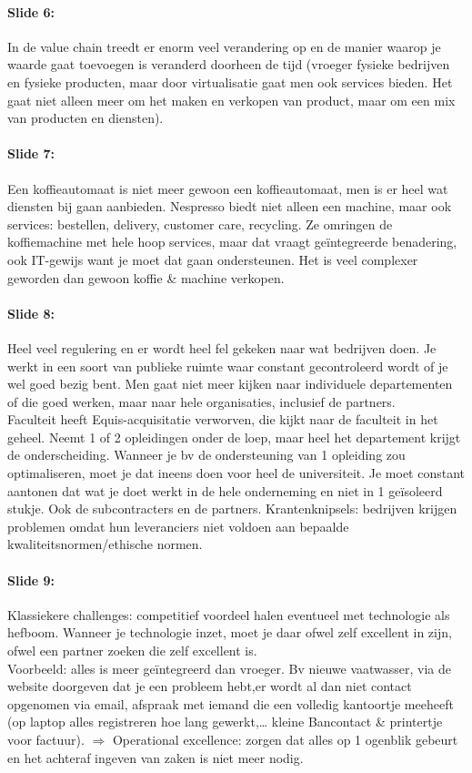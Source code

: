 \documentclass[10pt,a4paper]{report}
\begin{document}
\paragraph{Slide 6:}In de value chain treedt er enorm veel verandering op en de manier waarop je waarde gaat toevoegen is veranderd doorheen de tijd (vroeger fysieke bedrijven en fysieke producten, maar door virtualisatie gaat men ook services bieden. Het gaat niet alleen meer om het maken en verkopen van product, maar om een mix van producten en diensten).

\paragraph{Slide 7:}Een koffieautomaat is niet meer gewoon een koffieautomaat, men is er heel wat diensten bij gaan aanbieden. Nespresso biedt niet alleen een machine, maar ook services: bestellen, delivery, customer care, recycling. Ze omringen de koffiemachine met hele hoop services, maar dat vraagt geïntegreerde benadering, ook IT-gewijs want je moet dat gaan ondersteunen. Het is veel complexer geworden dan gewoon koffie \& machine verkopen.

\paragraph{Slide 8:}Heel veel regulering en er wordt heel fel gekeken naar wat bedrijven doen. Je werkt in een soort van publieke ruimte waar constant gecontroleerd wordt of je wel goed bezig bent. Men gaat niet meer kijken naar individuele departementen of die goed werken, maar naar hele organisaties, inclusief de partners.\\
Faculteit heeft Equis-acquisitatie verworven, die kijkt naar de faculteit in het geheel. Neemt 1 of 2 opleidingen onder de loep, maar heel het departement krijgt de onderscheiding.
Wanneer je bv de ondersteuning van 1 opleiding zou optimaliseren, moet je dat ineens doen voor heel de universiteit.  Je moet constant aantonen dat wat je doet werkt in de hele onderneming en niet in 1 geïsoleerd stukje. Ook de subcontracters en de partners. Krantenknipsels: bedrijven krijgen problemen omdat hun leveranciers niet voldoen aan bepaalde kwaliteitsnormen/ethische normen.

\paragraph{Slide 9:}Klassiekere challenges: competitief voordeel halen eventueel met technologie als hefboom. Wanneer je technologie inzet, moet je daar ofwel zelf excellent in zijn, ofwel een partner zoeken die zelf excellent is.\\
Voorbeeld: alles is meer geïntegreerd dan vroeger. Bv nieuwe vaatwasser, via de website doorgeven dat je een probleem hebt,er wordt al dan niet contact opgenomen via email, afspraak met iemand die een volledig kantoortje meeheeft (op laptop alles registreren hoe lang gewerkt,… kleine Bancontact \& printertje voor factuur). $\Rightarrow$ Operational excellence: zorgen dat alles op 1 ogenblik gebeurt en het achteraf ingeven van zaken is niet meer nodig.
\end{document}
